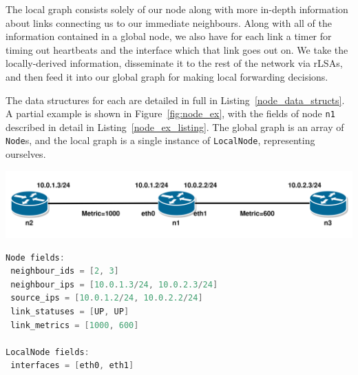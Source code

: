 \documentclass[withindex,glossary,openany]{cam-thesis}
\begin{document}
The local graph consists solely of our node along with more in-depth information about links connecting us to our immediate neighbours. Along with all of the information contained in a global node, we also have for each link a timer for timing out heartbeats and the interface which that link goes out on. We take the locally-derived information, disseminate it to the rest of the network via rLSAs, and then feed it into our global graph for making local forwarding decisions.

The data structures for each are detailed in full in Listing~\ref{node_data_structs}. A partial example is shown in Figure~\ref{fig:node_ex}, with the fields of node \texttt{n1} described in detail in Listing~\ref{node_ex_listing}. The global graph is an array of \texttt{Node}s, and the local graph is a single instance of \texttt{LocalNode}, representing ourselves.

\begin{center}
\begin{minipage}{0.9\textwidth} \centering
	\includegraphics[width=1\textwidth]{node}
	\label{fig:node_ex}
\end{minipage}
\end{center}

\begin{minipage}{1\textwidth} \centering
\begin{lstlisting}[language=C, label=node_ex_listing, frame=tb, columns=fullflexible, caption=Partial example of fields of \texttt{Node} and \texttt{LocalNode}]
Node fields:
 neighbour_ids = [2, 3]
 neighbour_ips = [10.0.1.3/24, 10.0.2.3/24]
 source_ips = [10.0.1.2/24, 10.0.2.2/24]
 link_statuses = [UP, UP]
 link_metrics = [1000, 600]

LocalNode fields:
 interfaces = [eth0, eth1]
\end{lstlisting}
\end{minipage}
\end{document}
